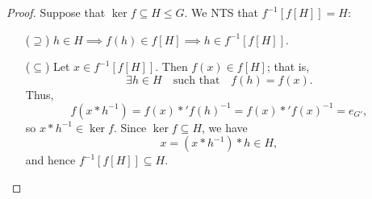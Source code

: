 \documentclass[11pt,openany]{article}
\begin{document}
\begin{proof}
	Suppose that $\ker f\subseteq H\leq G$. We NTS that $f^{-1}[f[H]]=H$: \begin{itemize}
		\item[($\supseteq$)] $h\in H\implies
		f(h)\in f[H]\implies h\in f^{-1}[f[H]]$.
		\item[($\subseteq$)] Let $x\in f^{-1}[f[H]]$. Then $f(x)\in f[H]$; that is, \[
		\exists h\in H\quad\text{such that}\quad f(h)=f(x).
		\] Thus, \[
		f(x\ast h^{-1})=f(x)\ast 'f(h)^{-1}=f(x)\ast'f(x)^{-1}=e_{G'},
		\] so $x\ast h^{-1}\in\ker f$. Since $\ker f\subseteq H$, we have \[
		x=(x\ast h^{-1})\ast h\in H,
		\] and hence $f^{-1}[f[H]]\subseteq H$.
	\end{itemize}
\end{proof}
\end{document}
